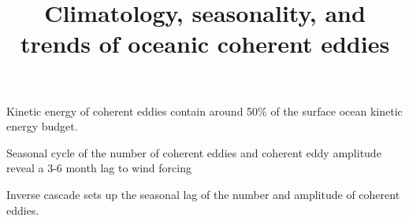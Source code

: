 \documentclass[draft,linenumbers]{agujournal2019}
\begin{document}
\title{Climatology, seasonality, and trends of oceanic coherent eddies}



\begin{keypoints}
	\item Kinetic energy of coherent eddies 
	contain around 50\% of the 
	surface ocean kinetic energy budget.
	\item Seasonal cycle of the number of coherent eddies and 
	coherent eddy amplitude reveal a 3-6 month lag to wind forcing
	\item Inverse cascade sets up the seasonal lag of the number and amplitude of coherent eddies.
\end{keypoints}
\end{document}

